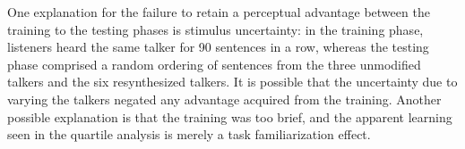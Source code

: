 One explanation for the failure to retain a perceptual advantage between the training to the testing phases is stimulus uncertainty: in the training phase, listeners heard the same talker for 90 sentences in a row, whereas the testing phase comprised a random ordering of sentences from the three unmodified talkers and the six resynthesized talkers.  It is possible that the uncertainty due to varying the talkers negated any advantage acquired from the training.  Another possible explanation is that the training was too brief, and the apparent learning seen in the quartile analysis is merely a task familiarization effect.




